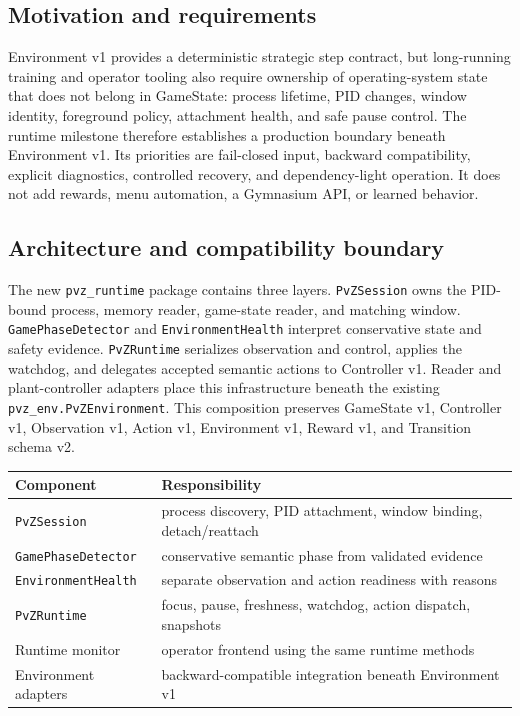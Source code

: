 \documentclass[11pt,a4paper]{article}
\begin{document}
\subsection{Motivation and requirements}
Environment v1 provides a deterministic strategic step contract, but long-running training and operator tooling also require ownership of operating-system state that does not belong in GameState: process lifetime, PID changes, window identity, foreground policy, attachment health, and safe pause control. The runtime milestone therefore establishes a production boundary beneath Environment v1. Its priorities are fail-closed input, backward compatibility, explicit diagnostics, controlled recovery, and dependency-light operation. It does not add rewards, menu automation, a Gymnasium API, or learned behavior.

\subsection{Architecture and compatibility boundary}
The new \texttt{pvz\_runtime} package contains three layers. \texttt{PvZSession} owns the PID-bound process, memory reader, game-state reader, and matching window. \texttt{GamePhaseDetector} and \texttt{EnvironmentHealth} interpret conservative state and safety evidence. \texttt{PvZRuntime} serializes observation and control, applies the watchdog, and delegates accepted semantic actions to Controller v1. Reader and plant-controller adapters place this infrastructure beneath the existing \texttt{pvz\_env.PvZEnvironment}. This composition preserves GameState v1, Controller v1, Observation v1, Action v1, Environment v1, Reward v1, and Transition schema v2.

\begin{center}
\begin{tabular}{ll}
\toprule
Component & Responsibility \\
\midrule
\texttt{PvZSession} & process discovery, PID attachment, window binding, detach/reattach \\
\texttt{GamePhaseDetector} & conservative semantic phase from validated evidence \\
\texttt{EnvironmentHealth} & separate observation and action readiness with reasons \\
\texttt{PvZRuntime} & focus, pause, freshness, watchdog, action dispatch, snapshots \\
Runtime monitor & operator frontend using the same runtime methods \\
Environment adapters & backward-compatible integration beneath Environment v1 \\
\bottomrule
\end{tabular}
\end{center}
\end{document}
